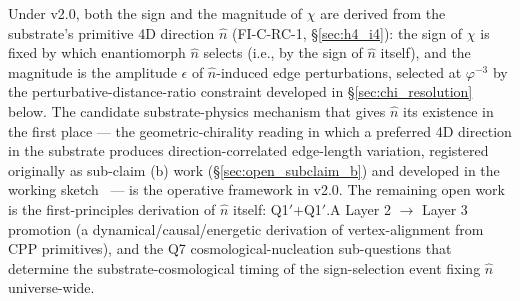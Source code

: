 \documentclass[11pt,letterpaper]{article}
\newcommand{\phig}{\varphi}
\begin{document}
Under v2.0, both the sign and the magnitude of $\chi$ are derived from the substrate's primitive 4D direction $\hat{n}$ (FI-C-RC-1, \S\ref{sec:h4_i4}): the sign of $\chi$ is fixed by which enantiomorph $\hat{n}$ selects (i.e., by the sign of $\hat{n}$ itself), and the magnitude is the amplitude $\epsilon$ of $\hat{n}$-induced edge perturbations, selected at $\phig^{-3}$ by the perturbative-distance-ratio constraint developed in \S\ref{sec:chi_resolution} below. The candidate substrate-physics mechanism that gives $\hat{n}$ its existence in the first place --- the geometric-chirality reading in which a preferred 4D direction in the substrate produces direction-correlated edge-length variation, registered originally as sub-claim (b) work (\S\ref{sec:open_subclaim_b}) and developed in the working sketch~\cite{abshier_capotauro_chiral_mechanism_sketch} --- is the operative framework in v2.0. The remaining open work is the first-principles derivation of $\hat{n}$ itself: Q1$'$+Q1$'$.A Layer 2 $\to$ Layer 3 promotion (a dynamical/causal/energetic derivation of vertex-alignment from CPP primitives), and the Q7 cosmological-nucleation sub-questions that determine the substrate-cosmological timing of the sign-selection event fixing $\hat{n}$ universe-wide.
\end{document}
